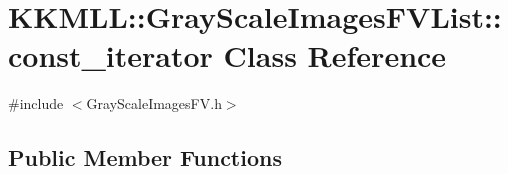 \hypertarget{class_k_k_m_l_l_1_1_gray_scale_images_f_v_list_1_1const__iterator}{}\section{K\+K\+M\+LL\+:\+:Gray\+Scale\+Images\+F\+V\+List\+:\+:const\+\_\+iterator Class Reference}
\label{class_k_k_m_l_l_1_1_gray_scale_images_f_v_list_1_1const__iterator}


{\ttfamily \#include $<$Gray\+Scale\+Images\+F\+V.\+h$>$}

\subsection*{Public Member Functions}
